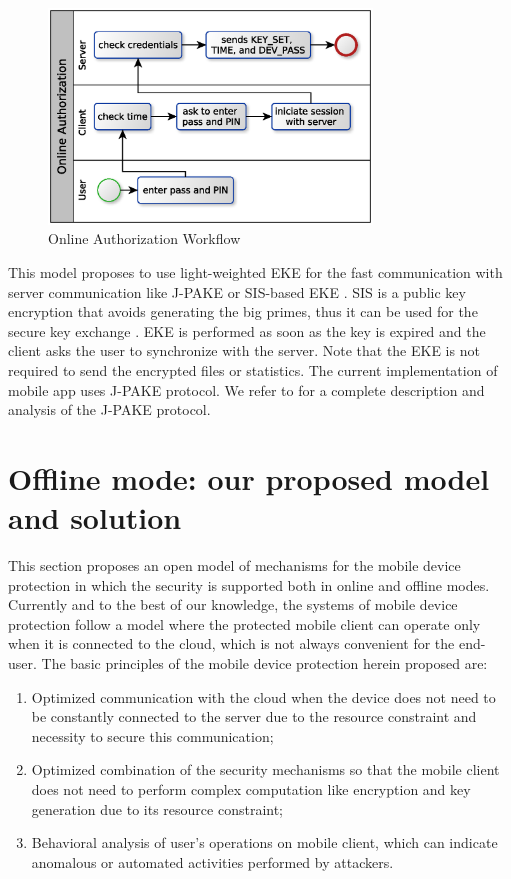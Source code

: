 \documentclass[twocolumn]{svjour3}          	%
\begin{document}
\begin{figure}[h!]
	\centering
	\includegraphics[width=8.6cm]{figures/onlineauthorizationworkflow.eps}
	\caption{Online Authorization Workflow}
	\label{fig:4}
\end{figure}

This model proposes to use light-weighted EKE for the fast communication with server communication like J-PAKE \cite{hao2010j, hao2008password} or SIS-based EKE \cite{bogos2013primeless}. SIS is a public key encryption that avoids generating the big primes, thus it can be used for the secure key exchange \cite{bogos2013primeless,bellovin1992encrypted}. EKE is performed as soon as the key is expired and the client asks the user to synchronize with the server. Note that the EKE is not required to send the encrypted files or statistics. The current implementation of mobile app uses J-PAKE protocol. We refer to \cite{hao2010j, hao2008password, toorani2014security} for a complete description and analysis of the J-PAKE protocol.

\section{Offline mode: our proposed model and solution}
\label{sec_offline_mode}
This section proposes an open model of mechanisms for the mobile device protection in which the security is supported both in online and offline modes. Currently and to the best of our knowledge, the systems of mobile device protection follow a model where the protected mobile client can operate only when it is connected to the cloud, which is not always convenient for the end-user. The basic principles of the mobile device protection herein proposed are: 

\begin{enumerate}
	\item Optimized communication with the cloud when the device does not need to be constantly connected to the server due to the resource constraint and necessity to secure this communication;
	\item Optimized combination of the security mechanisms so that the mobile client does not need to perform complex computation like encryption and key generation due to its resource constraint;
	\item Behavioral analysis of user's operations on mobile client, which can indicate anomalous or automated activities performed by attackers.
\end{enumerate}
\end{document}
